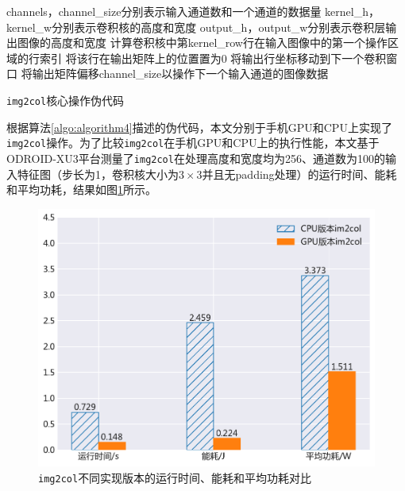 \begin{algorithm}[htbp]
  \small
  \SetAlgoLined
    \begin{spacing}{0.8}
    channels，channel\_size分别表示输入通道数和一个通道的数据量\;
    kernel\_h，kernel\_w分别表示卷积核的高度和宽度\;
  output\_h，output\_w分别表示卷积层输出图像的高度和宽度\;
     {
         {
             {
                计算卷积核中第kernel\_row行在输入图像中的第一个操作区域的行索引\;
                 {
                     {
                         {
                            将该行在输出矩阵上的位置置为0\;
                        }
                    } 
                    将输出行坐标移动到下一个卷积窗口\;
                }
            }
        }
        将输出矩阵偏移channel\_size以操作下一个输入通道的图像数据\;
    }
    \end{spacing}
  \caption{\texttt{img2col}核心操作伪代码}
  \label{algo:algorithm4}
\end{algorithm}

根据算法\ref{algo:algorithm4}描述的伪代码，本文分别于手机GPU和CPU上实现了\texttt{img2col}操作。为了比较\texttt{img2col}在手机GPU和CPU上的执行性能，本文基于ODROID-XU3平台测量了\texttt{img2col}在处理高度和宽度均为256、通道数为100的输入特征图（步长为1，卷积核大小为$3 \times 3$并且无padding处理）的运行时间、能耗和平均功耗，结果如图\ref{figure:figure11}所示。

\begin{figure}[htbp]
    \begin{center}
    \includegraphics[height=0.4\textwidth]{figures/im2col_energy.pdf}
    \end{center}
    \caption{\texttt{img2col}不同实现版本的运行时间、能耗和平均功耗对比}\label{figure:figure11}
\end{figure}

